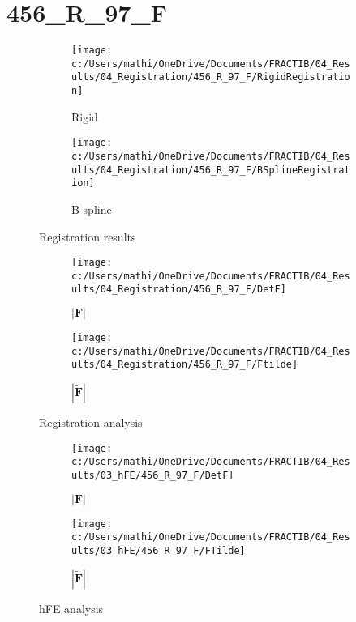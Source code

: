 \documentclass{article}%
\begin{document}
%
\newpage%
\section*{456\_R\_97\_F}%
\label{sec:456R97F}%


\begin{figure}[h!]%
\begin{subfigure}[b]{0.5\linewidth}%
\texttt{[image: c:/Users/mathi/OneDrive/Documents/FRACTIB/04\_Results/04\_Registration/456\_R\_97\_F/RigidRegistration]}%
\caption{Rigid}%
\end{subfigure}%
\begin{subfigure}[b]{0.5\linewidth}%
\texttt{[image: c:/Users/mathi/OneDrive/Documents/FRACTIB/04\_Results/04\_Registration/456\_R\_97\_F/BSplineRegistration]}%
\caption{B{-}spline}%
\end{subfigure}%
\caption{Registration results}%
\end{figure}

%


\begin{figure}[h!]%
\begin{subfigure}[b]{0.5\linewidth}%
\texttt{[image: c:/Users/mathi/OneDrive/Documents/FRACTIB/04\_Results/04\_Registration/456\_R\_97\_F/DetF]}%
\caption{$|\mathbf{F}|$}%
\end{subfigure}%
\begin{subfigure}[b]{0.5\linewidth}%
\texttt{[image: c:/Users/mathi/OneDrive/Documents/FRACTIB/04\_Results/04\_Registration/456\_R\_97\_F/Ftilde]}%
\caption{$|\widetilde{\mathbf{F}}|$}%
\end{subfigure}%
\caption{Registration analysis}%
\end{figure}

%


\begin{figure}[h!]%
\begin{subfigure}[b]{0.5\linewidth}%
\texttt{[image: c:/Users/mathi/OneDrive/Documents/FRACTIB/04\_Results/03\_hFE/456\_R\_97\_F/DetF]}%
\caption{$|\mathbf{F}|$}%
\end{subfigure}%
\begin{subfigure}[b]{0.5\linewidth}%
\texttt{[image: c:/Users/mathi/OneDrive/Documents/FRACTIB/04\_Results/03\_hFE/456\_R\_97\_F/FTilde]}%
\caption{$|\widetilde{\mathbf{F}}|$}%
\end{subfigure}%
\caption{hFE analysis}%
\end{figure}

%
\newpage%
\end{document}
